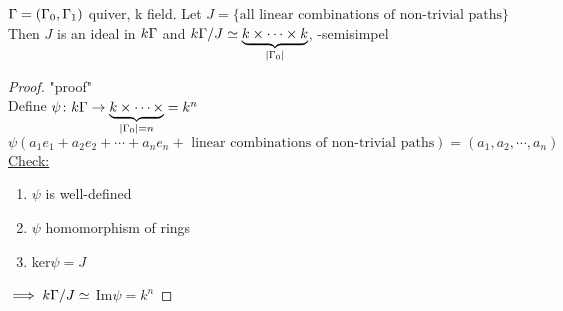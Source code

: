 \begin{prop}
	$\Gamma=(\Gamma_0,\Gamma_1) $ quiver, k field. Let $J = \{\text{all linear combinations of non-trivial paths}\}$
	Then $J$ is an ideal in $k\Gamma$ and $k\Gamma/J \simeq \underbrace{k \times \cdots \times k}_{|\Gamma_0|}$, -semisimpel
\end{prop}

\begin{proof}"proof"\\
	Define $\psi\colon k\Gamma \rightarrow \underbrace{k \times \cdots \times}_{|\Gamma_0|=n} = k^n $\\
	$\psi(a_1e_1 + a_2e_2 + \cdots + a_ne_n + \text{ linear combinations of non-trivial paths} ) = (a_1, a_2, \cdots, a_n)$\\\newline
	\underline{Check:} \begin{enumerate}
		\item  $\psi$ is well-defined
		\item $\psi$ homomorphism of rings
		\item ker$\psi=J$
	\end{enumerate}
	$\implies k\Gamma/J \simeq$ Im$\psi=k^n$
\end{proof}
